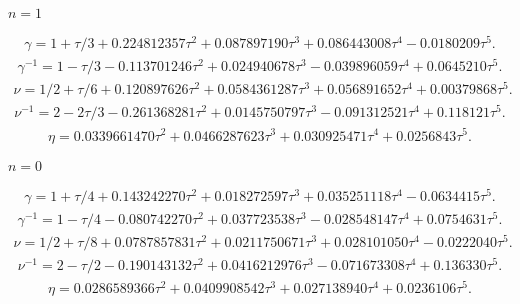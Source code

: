 \documentclass[preprint,preprintnumbers,amsmath,amssymb]{revtex4}
\begin{document}
\begin{center}
\textbf{$n = 1$}
\end{center}
\begin{eqnarray}
\gamma = 1 + \tau/3 + 0.224812357 \tau^{2}
+ 0.087897190 \tau^{3}+0.086443008\tau^{4}-0.0180209 \tau^{5}.
\end{eqnarray}
\begin{eqnarray}
\gamma^{-1} = 1 - \tau/3 - 0.113701246 \tau^2
+ 0.024940678 \tau^3-0.039896059 \tau^4+0.0645210 \tau^5.
\end{eqnarray}
\begin{eqnarray}
\nu = 1/2 + \tau/6 + 0.120897626 \tau^{2}
+ 0.0584361287 \tau^{3} + 0.056891652 \tau^{4} + 0.00379868 \tau^{5}.
\end{eqnarray}
\begin{eqnarray}
\nu^{-1} = 2 - 2\tau/3 - 0.261368281 \tau^{2}
+ 0.0145750797 \tau^{3} - 0.091312521 \tau^{4} + 0.118121 \tau^{5}.
\end{eqnarray}
\begin{eqnarray}
\eta = 0.0339661470 {\tau}^{2}+0.0466287623 {\tau}^{3}
+ 0.030925471 {\tau}^{4}+0.0256843 {\tau}^{5}.
\end{eqnarray}

\begin{center}
\textbf{$n = 0$}
\end{center}
\begin{eqnarray}
\gamma = 1 + \tau/4 + 0.143242270 \tau^{2} + 0.018272597 \tau^{3}
+ 0.035251118 \tau^{4}-0.0634415\tau^{5}.
\end{eqnarray}
\begin{eqnarray}
\gamma^{-1} = 1- \tau/4 - 0.080742270\tau^{2}+0.037723538 \tau^{3}
- 0.028548147 \tau^{4}+0.0754631 \tau^{5}.
\end{eqnarray}
\begin{eqnarray}
\nu = 1/2 + \tau/8 + 0.0787857831 \tau^{2}
+ 0.0211750671 \tau^{3} + 0.028101050 \tau^{4} - 0.0222040 \tau^{5}.
\end{eqnarray}
\begin{eqnarray}
\nu^{-1} = 2 - \tau/2 - 0.190143132 \tau^{2}
+ 0.0416212976 \tau^{3} - 0.071673308 \tau^{4} + 0.136330 \tau^{5}.
\end{eqnarray}
\begin{eqnarray}
\eta = 0.0286589366 {\tau}^{2} + 0.0409908542 {\tau}^{3}
+ 0.027138940 {\tau}^{4} + 0.0236106 {\tau}^{5}.
\end{eqnarray}
\end{document}
